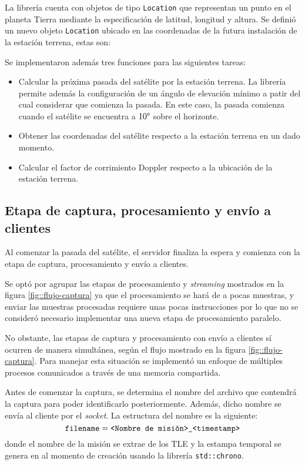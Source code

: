 \documentclass[../../main.tex]{subfiles}
\begin{document}
La librería cuenta con objetos de tipo \texttt{Location} que representan un punto en el planeta Tierra mediante la especificación de latitud, longitud y altura. Se definió un nuevo objeto \texttt{Location} ubicado en las coordenadas de la futura instalación de la estación terrena, estas son:

Se implementaron además tres funciones para las siguientes tareas:
\begin{itemize}
    \item Calcular la próxima pasada del satélite por la estación terrena. La librería permite además la configuración de un ángulo de elevación mínimo a patir del cual considerar que comienza la pasada. En este caso, la pasada comienza cuando el satélite se encuentra a $10\degree$ sobre el horizonte.
    \item Obtener las coordenadas del satélite respecto a la estación terrena en un dado momento.
    \item Calcular el factor de corrimiento Doppler respecto a la ubicación de la estación terrena.
\end{itemize}

\subsection{Etapa de captura, procesamiento y envío a clientes}
Al comenzar la pasada del satélite, el servidor finaliza la espera y comienza con la etapa de captura, procesamiento y envío a clientes.

Se optó por agrupar las etapas de procesamiento y \textit{streaming} mostrados en la figura \ref{fig::flujo-captura} ya que el procesamiento se hará de a pocas muestras, y enviar las muestras procesadas requiere unas pocas instrucciones por lo que no se consideró necesario implementar una nueva etapa de procesamiento paralelo.

No obstante, las etapas de captura y procesamiento con envío a clientes sí ocurren de manera simultánea, según el flujo mostrado en la figura \ref{fig::flujo-captura}. Para manejar esta situación se implementó un enfoque de múltiples procesos comunicados a través de una memoria compartida. 

Antes de comenzar la captura, se determina el nombre del archivo que contendrá la captura para poder identificarlo posteriormente. Además, dicho nombre se envía al cliente por el \textit{socket}. La estructura del nombre es la siguiente:
\[\texttt{filename} = \texttt{<Nombre de misión>\_<timestamp>\\}\]
donde el nombre de la misión se extrae de los TLE y la estampa temporal se genera en al momento de creación usando la librería \texttt{std::chrono}.
\end{document}
